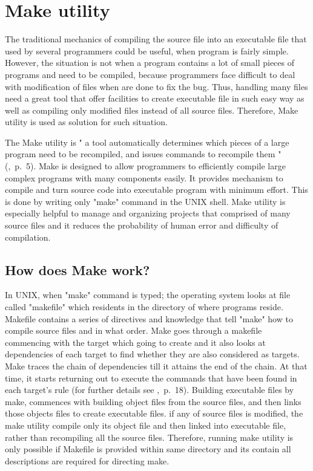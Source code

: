 \documentclass[11pt]{report}
\begin{document}
\section{Make utility}
\label{sec: Make}
The traditional mechanics of compiling the source file into an executable file that used by several programmers could be useful, when program is fairly simple. However, the situation is not when a program contains a lot of small pieces of programs and need to be compiled, because programmers face difficult to deal with modification of files when are done to fix the bug. Thus, handling many files need a great tool that offer facilities to create executable file in such easy way as well as compiling only modified files instead of all source files. Therefore, Make utility is used as solution for such situation.

The Make utility is " a tool automatically determines which pieces of a large program need to be recompiled, and issues commands to recompile them " (\cite{Stallman:2000:GnuMake},~p.~5). Make is designed to allow programmers to efficiently compile large complex programs with many components easily. It provides mechanism to compile and turn source code into executable program with minimum effort. This is done by writing only "make" command in the UNIX shell. Make utility is especially helpful to manage and organizing projects that comprised of many source files and it reduces the probability of human error and difficulty of compilation.

\subsection{How does Make work?}
\label{subsec: how make work}
In UNIX, when "make" command is typed; the operating system looks at file called "makefile" which residents in the directory of where programs reside. Makefile contains a series of directives and knowledge that tell "make" how to compile source files and in what order. Make goes through a makefile commencing with the target which going to create and it also looks at dependencies of each target to find whether they are also considered as targets.  Make traces the chain of dependencies till it attains the end of the chain. At that time, it starts returning out to execute the commands that have been found in each target's rule (for further details see \cite{Stallman:2000:GnuMake},~p.~18). Building executable files by make, commences with building object files from the source files, and then links those objects files to create executable files. if any of source files is modified, the make utility compile only its object file and then linked into executable file, rather than recompiling all the source files. Therefore, running make utility is only possible if Makefile is provided within same directory and its contain all descriptions are required for directing make.
\end{document}
